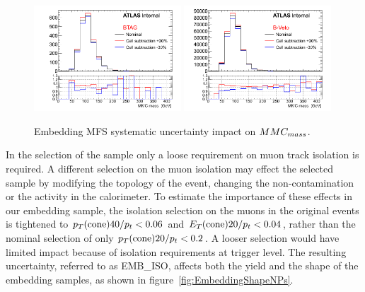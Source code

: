 \begin{figure}[tp]
	\begin{center}
	\includegraphics[width=0.49\textwidth]{figure/systematics/emb_sys_BtagFull_MFS.png}
	\includegraphics[width=0.49\textwidth]{figure/systematics/emb_sys_NoBtagFull_MFS.png}
	\end{center}
	\caption{Embedding MFS systematic uncertainty impact on $MMC_{mass}$.}
	\label{fig:EMBMFS}
\end{figure}

%
%	
%

In the selection of the \Zmumu sample only a loose requirement on muon track isolation is required.
A different selection on the muon isolation may effect the selected sample by modifying the topology of the event, %
changing the non-\Zmumu contamination or the activity in the calorimeter. 
To estimate  the importance of these effects in our
embedding sample, the isolation selection on the muons in the original \Zmumu events is tightened to $p_{T}(\mathrm{cone}) 40/ p_{t}<0.06$ and $E_{T}(\mathrm{cone}) 20/ p_{t}<0.04$, rather than the nominal selection of only $p_{T}(\mathrm{cone}) 20/ p_{t}<0.2 $. 
A looser selection would have limited impact because of isolation requirements at trigger level.
The resulting uncertainty, referred to as EMB\_ISO, affects both the yield and the \mmc shape of the embedding samples, as shown in figure~\ref{fig:EmbeddingShapeNPs}. 

